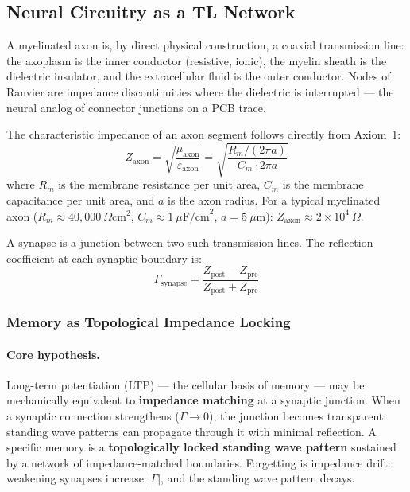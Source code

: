 \subsection{Neural Circuitry as a TL Network}
\label{sec:neural_tl}

A myelinated axon is, by direct physical construction, a
coaxial transmission line: the axoplasm is the inner conductor
(resistive, ionic), the myelin sheath is the dielectric
insulator, and the extracellular fluid is the outer conductor.
Nodes of Ranvier are impedance discontinuities where the
dielectric is interrupted --- the neural analog of connector
junctions on a PCB trace.

The characteristic impedance of an axon segment follows
directly from Axiom~1:
\begin{equation}
    Z_\text{axon} = \sqrt{\frac{\mu_\text{axon}}{\varepsilon_\text{axon}}}
    = \sqrt{\frac{R_m / (2\pi a)}{C_m \cdot 2\pi a}}
    \label{eq:z_axon}
\end{equation}
where $R_m$ is the membrane resistance per unit area, $C_m$
is the membrane capacitance per unit area, and $a$ is the
axon radius.  For a typical myelinated axon ($R_m \approx
40{,}000~\Omega\text{cm}^2$, $C_m \approx 1~\mu\text{F/cm}^2$,
$a = 5~\mu\text{m}$): $Z_\text{axon} \approx 2 \times 10^4~\Omega$.

A synapse is a junction between two such transmission lines.
The reflection coefficient at each synaptic boundary is:
\begin{equation}
    \Gamma_\text{synapse} = \frac{Z_\text{post} - Z_\text{pre}}
                                  {Z_\text{post} + Z_\text{pre}}
    \label{eq:gamma_synapse}
\end{equation}

\subsubsection{Memory as Topological Impedance Locking}
\label{sec:future_memory}

\paragraph{Core hypothesis.}
Long-term potentiation (LTP) --- the cellular basis of
memory --- may be mechanically equivalent to
\textbf{impedance matching} at a synaptic junction.  When
a synaptic connection strengthens ($\Gamma \to 0$), the
junction becomes transparent: standing wave patterns can
propagate through it with minimal reflection.  A specific
memory is a \textbf{topologically locked standing wave
pattern} sustained by a network of impedance-matched
boundaries.  Forgetting is impedance drift: weakening
synapses increase $|\Gamma|$, and the standing wave
pattern decays.

